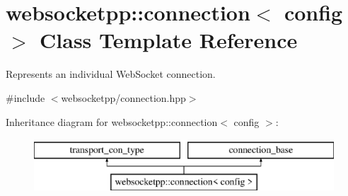 \hypertarget{classwebsocketpp_1_1connection}{}\section{websocketpp\+:\+:connection$<$ config $>$ Class Template Reference}
\label{classwebsocketpp_1_1connection}


Represents an individual Web\+Socket connection.  




{\ttfamily \#include $<$websocketpp/connection.\+hpp$>$}

Inheritance diagram for websocketpp\+:\+:connection$<$ config $>$\+:\begin{figure}[H]
\begin{center}
\leavevmode
\includegraphics[height=2.000000cm]{classwebsocketpp_1_1connection}
\end{center}
\end{figure}
